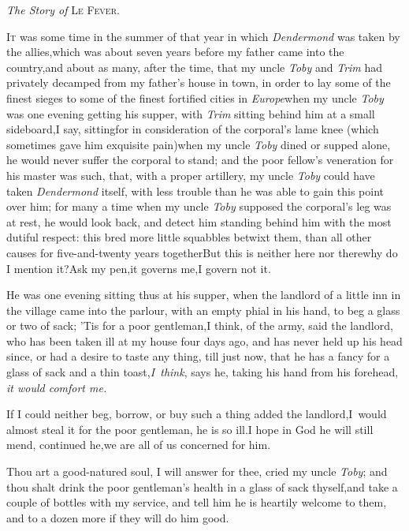 \documentclass{article}
\begin{document}
\medskip
\centerline{\textit{The Story of} \textsc{Le Fever}.}

\lettrine{I}{t} was some time in the summer of
that year in which \textit{Dendermond} was taken by the
allies,\tsk which was about seven years before my father came
into the country,\tsk and about as many, after the time, that my
uncle \textit{Toby} and \textit{Trim} had privately decamped from my
father’s house in town, in order to lay some of the finest
sieges to some of the finest fortified cities in
\textit{Europe}\tsh when my uncle \textit{Toby} was one
evening getting his supper, with \textit{Trim} sitting behind him at
a small sideboard,\tsk I say, sitting\tsk for\pb
in consideration of the corporal’s lame knee
(which sometimes gave him exqui\-site pain)\tsk when my uncle
\textit{Toby} dined or supped alone, he would never suffer the
corporal to stand; and the poor fellow’s veneration for his
master was such, that, with a proper artillery, my uncle
\textit{Toby} could have taken \textit{Dendermond} itself, with less
trouble than he was able to gain this point over him; for many a
time when my uncle \textit{Toby} supposed the corporal’s leg
was at rest, he would look back, and detect him standing behind him
with the most dutiful respect: this bred more little squabbles
betwixt them, than all other causes for five-and-twenty years
together\tsk But this is neither here nor there\tsk why do I
mention it?\tsh\break Ask my pen,\tsk it governs me,\tsk I
govern not it.

\newpage
He was one evening sitting thus at his supper, when the landlord
of a little inn in the village came into the parlour, with an
empty phial in his hand, to beg a glass or two of sack; ’Tis for
a poor gentleman,\tsk I think, of the army, said the landlord,
who has been taken ill at my house four days ago, and has never
held up his head since, or had a desire to taste any thing, till
just now, that he has a fancy for a glass of sack and a thin
toast,\tsh \textit{I~think}, says he, taking his hand from his
forehead, \textit{it would comfort me.}\tsh

\tsh If I could neither beg, borrow, or buy such a thing\tsk
added the landlord,\tsk I~would almost steal it for the poor
gentleman, he is so ill.\tsh I hope in God he will still mend,
continued he,\tsk we are all of us concerned for him.

\newpage
Thou art a good-natured soul, I will answer for thee, cried my
uncle \textit{Toby}; and thou shalt drink the poor gentleman’s
health in a glass of sack thyself,\break\tsk and take a couple of
bottles with my service, and tell him he is heartily welcome to
them, and to a dozen more if they will do him good.
\end{document}
